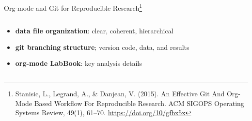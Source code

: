 \documentclass[10pt,aspectratio=169]{beamer}
\begin{document}
\begin{frame}{Org-mode and Git for Reproducible Research\footnote{Stanisic, L., Legrand, A., & Danjean, V. (2015). An Effective Git And Org-Mode Based Workflow For Reproducible Research. ACM SIGOPS Operating Systems Review, 49(1), 61–70. \tiny{\url{https://doi.org/10/gfbx5x}}
}}
    \begin{columns}[c]
    \begin{column}{.3\textwidth} %
    \begin{minipage}{1\textwidth}
    \begin{itemize}
        \item<1->\textbf{data file organization}: clear, coherent, hierarchical
        \item<2->\textbf{git branching structure}; version code, data, and results
        \item<3->\textbf{org-mode LabBook}: key analysis details
    \end{itemize}
    \end{minipage}
    \end{column}
    \begin{column}{.7\textwidth} %
\end{column}
\end{columns}
\end{frame}
\end{document}
